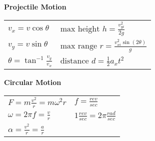 \documentclass[12pt]{article}
\begin{document}
\begin{minipage}[t]{.5\textwidth}
\textbf{\large{Projectile Motion}} \\[6pt]
	\begin{tabular}{p{3cm} p{6cm}}
	$v_x = v \cos \theta$ & $\text{max height   } h = \frac{v_{yi}^2}{2g}$ \\[6pt]
	$v_y = v \sin \theta$ & $\text{max range   } r = \frac{v_{xi}^2 \sin(2\theta)}{g}$ \\[6pt]
		
	$\theta = \tan ^{-1} \frac{v_y}{v_x}$ & $\text{distance    } d = \tfrac{1}{2} a_x t^2$ \\[6pt]
	\end{tabular}

\end{minipage}\vspace{12pt}
\begin{minipage}[t]{.5\textwidth}
\textbf{\large{Circular Motion}} \\[6pt]
\begin{tabular}{p{4cm} p{6cm}}
	$F=m \frac{v^2}{r}=m \omega^2 r$ & $f = \frac{rev}{sec}$ \\[6pt]
	$\omega = 2\pi f = \frac{v}{r}$ & $1 \frac{rev}{sec} = 2\pi \frac{rad}{sec}$\\[6pt]
	$\alpha = \frac{v^2}{r} = \frac{a}{r}$ & \\[12pt]
\end{tabular}		

\end{minipage}
\end{document}

